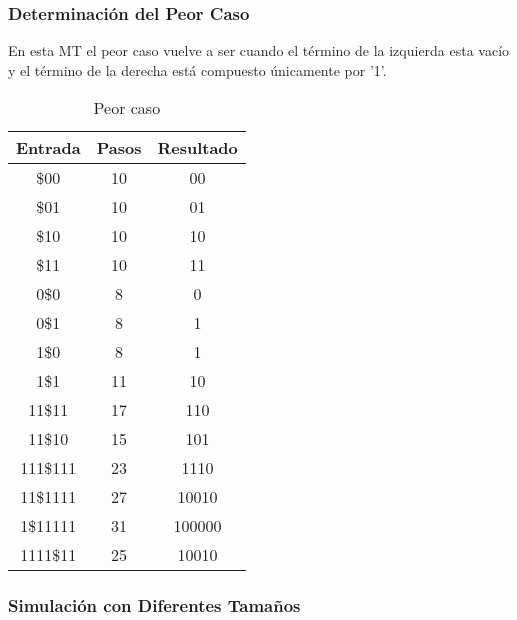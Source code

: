 \documentclass{uc3mpracticas}
\begin{document}
  \newpage

  \subsubsection{Determinación del Peor Caso}

  En esta MT el peor caso vuelve a ser cuando el término de la izquierda esta vacío y el término de la derecha está compuesto únicamente por '1'.

  \begin{table}[!h]
    \centering
  \begin{tabular}{|c|c|c|}
  \hline
  \textbf{Entrada} & \textbf{Pasos} & \textbf{Resultado} \\ \hline
  \$00             & 10             & 00                 \\ \hline
  \$01             & 10             & 01                 \\ \hline
  \$10             & 10             & 10                 \\ \hline
  \$11             & 10             & 11                 \\ \hline
  0\$0             & 8              & 0                  \\ \hline
  0\$1             & 8              & 1                  \\ \hline
  1\$0             & 8              & 1                  \\ \hline
  1\$1             & 11             & 10                 \\ \hline
  11\$11           & 17             & 110                \\ \hline
  11\$10           & 15             & 101                \\ \hline
  111\$111         & 23             & 1110               \\ \hline
  11\$1111         & 27             & 10010              \\ \hline
  1\$11111         & 31             & 100000             \\ \hline
  1111\$11         & 25             & 10010              \\ \hline
  \end{tabular}
  \caption{Peor caso}
  \end{table}



  \subsubsection{Simulación con Diferentes Tamaños}
\end{document}
